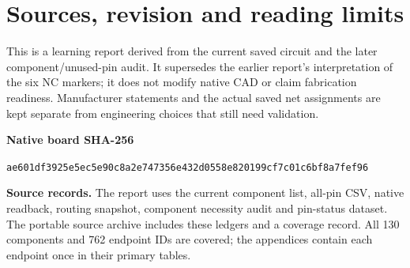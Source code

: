 \documentclass[11pt,a4paper]{article}
\begin{document}
\clearpage\section{Sources, revision and reading limits}\label{sec:sources}

This is a learning report derived from the current saved circuit and the later component/unused-pin audit. It supersedes the earlier report's interpretation of the six NC markers; it does not modify native CAD or claim fabrication readiness. Manufacturer statements and the actual saved net assignments are kept separate from engineering choices that still need validation.

\textbf{Native board SHA-256}\par

\nolinkurl{ae601df3925e5ec5e90c8a2e747356e432d0558e820199cf7c01c6bf8a7fef96}


\textbf{Source records.} The report uses the current component list, all-pin CSV, native readback, routing snapshot, component necessity audit and pin-status dataset. The portable source archive includes these ledgers and a coverage record. All 130 components and 762 endpoint IDs are covered; the appendices contain each endpoint once in their primary tables.
\end{document}
